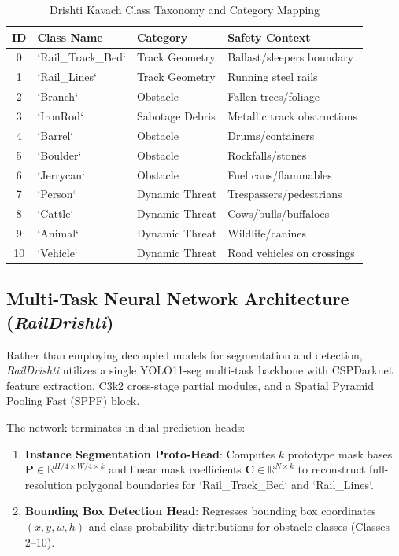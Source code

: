 \documentclass[conference]{IEEEtran}
\begin{document}
\begin{table}[h]
\centering
\caption{Drishti Kavach Class Taxonomy and Category Mapping}
\label{tab:classes}
\begin{tabular}{c l l p{3.2cm}}
\toprule
\textbf{ID} & \textbf{Class Name} & \textbf{Category} & \textbf{Safety Context} \\
\midrule
0 & `Rail\_Track\_Bed` & Track Geometry & Ballast/sleepers boundary \\
1 & `Rail\_Lines` & Track Geometry & Running steel rails \\
2 & `Branch` & Obstacle & Fallen trees/foliage \\
3 & `IronRod` & Sabotage Debris & Metallic track obstructions \\
4 & `Barrel` & Obstacle & Drums/containers \\
5 & `Boulder` & Obstacle & Rockfalls/stones \\
6 & `Jerrycan` & Obstacle & Fuel cans/flammables \\
7 & `Person` & Dynamic Threat & Trespassers/pedestrians \\
8 & `Cattle` & Dynamic Threat & Cows/bulls/buffaloes \\
9 & `Animal` & Dynamic Threat & Wildlife/canines \\
10 & `Vehicle` & Dynamic Threat & Road vehicles on crossings \\
\bottomrule
\end{tabular}
\end{table}

\subsection{Multi-Task Neural Network Architecture (\textit{RailDrishti})}
Rather than employing decoupled models for segmentation and detection, \textit{RailDrishti} utilizes a single YOLO11-seg multi-task backbone with CSPDarknet feature extraction, C3k2 cross-stage partial modules, and a Spatial Pyramid Pooling Fast (SPPF) block.

The network terminates in dual prediction heads:
\begin{enumerate}
    \item \textbf{Instance Segmentation Proto-Head}: Computes $k$ prototype mask bases $\mathbf{P} \in \mathbb{R}^{H/4 \times W/4 \times k}$ and linear mask coefficients $\mathbf{C} \in \mathbb{R}^{N \times k}$ to reconstruct full-resolution polygonal boundaries for `Rail\_Track\_Bed` and `Rail\_Lines`.
    \item \textbf{Bounding Box Detection Head}: Regresses bounding box coordinates $(x, y, w, h)$ and class probability distributions for obstacle classes (Classes 2--10).
\end{enumerate}
\end{document}
